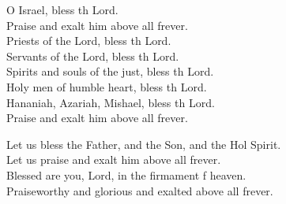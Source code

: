 \begin{psalmverse}
\begin{patverse}
O Israel, bless th Lord.\Med\\
Praise and exalt him above all frever.\\
Priests of the Lord, bless th Lord.\Med\\
Servants of the Lord, bless th Lord.\\
Spirits and souls of the just, bless th Lord.\Med\\
Holy men of humble heart, bless th Lord.\\
Hananiah, Azariah, Mishael, bless th Lord.\Med\\
Praise and exalt him above all frever.

Let us bless the Father, and the Son, and the Hol Spirit.\Med\\
Let us praise and exalt him above all frever.\\
Blessed are you, Lord, in the firmament f heaven.\Med\\
Praiseworthy and glorious and exalted above all frever.
  \end{patverse}
\end{psalmverse}
